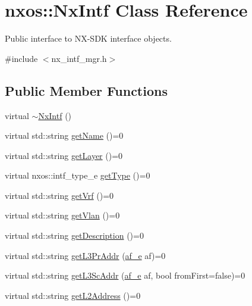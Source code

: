 \hypertarget{classnxos_1_1_nx_intf}{}\section{nxos\+:\+:Nx\+Intf Class Reference}
\label{classnxos_1_1_nx_intf}


Public interface to N\+X-\/\+S\+DK interface objects.  




{\ttfamily \#include $<$nx\+\_\+intf\+\_\+mgr.\+h$>$}

\subsection*{Public Member Functions}
\begin{DoxyCompactItemize}
\item 
virtual \mbox{\hyperlink{classnxos_1_1_nx_intf_a10fbaca5467637b238b8a4f1f1aa75e0}{$\sim$\+Nx\+Intf}} ()
\item 
virtual std\+::string \mbox{\hyperlink{classnxos_1_1_nx_intf_a8a0bff66b97d72172f8ed5ce22d8efbd}{get\+Name}} ()=0
\item 
virtual std\+::string \mbox{\hyperlink{classnxos_1_1_nx_intf_af3a8f5ce6dd05fa582d1f7056a4438ca}{get\+Layer}} ()=0
\item 
virtual nxos\+::intf\+\_\+type\+\_\+e \mbox{\hyperlink{classnxos_1_1_nx_intf_aa0885ab26e4abfaa8c7e8e8adb9d32ab}{get\+Type}} ()=0
\item 
virtual std\+::string \mbox{\hyperlink{classnxos_1_1_nx_intf_ae8d21d7a42388aedcda5c7bc3f5c4b04}{get\+Vrf}} ()=0
\item 
virtual std\+::string \mbox{\hyperlink{classnxos_1_1_nx_intf_a3f7942d5ae1a998904d9ea97b252eb21}{get\+Vlan}} ()=0
\item 
virtual std\+::string \mbox{\hyperlink{classnxos_1_1_nx_intf_ae18aa83b5f9984c6b133a8d447aa5430}{get\+Description}} ()=0
\item 
virtual std\+::string \mbox{\hyperlink{classnxos_1_1_nx_intf_ace33155a23a777c0f6e5f978d44af0e6}{get\+L3\+Pr\+Addr}} (\mbox{\hyperlink{nx__common_8h_a3a667f48b94db10aa398940dc5bf72d7}{af\+\_\+e}} af)=0
\item 
virtual std\+::string \mbox{\hyperlink{classnxos_1_1_nx_intf_af0aebadac66f6b4fbe8ddbd567a577b6}{get\+L3\+Sc\+Addr}} (\mbox{\hyperlink{nx__common_8h_a3a667f48b94db10aa398940dc5bf72d7}{af\+\_\+e}} af, bool from\+First=false)=0
\item 
virtual std\+::string \mbox{\hyperlink{classnxos_1_1_nx_intf_a8a7f92f0c28178165fd0448c33ff681b}{get\+L2\+Address}} ()=0

\end{DoxyCompactItemize}
